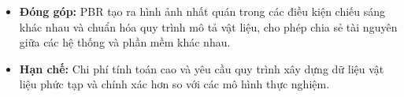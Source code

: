 \begin{enumerate}
\begin{itemize}
\begin{enumerate}
			\item \textit{Bảo toàn năng lượng}\\
			Năng lượng phản xạ ra khỏi bề mặt phải luôn nhỏ hơn hoặc bằng năng lượng ánh sáng chiếu tới.

			\item \textit{Đối ứng Helmholtz}\\
			Việc hoán đổi hướng ánh sáng tới và hướng ánh sáng phản xạ sẽ không làm thay đổi giá trị của BDRF.

			\item \textit{Tính Tuyến tính và Nguyên lý chồng chất}\\
			Tổng độ sáng phản xạ của một bề mặt phải bằng tổng độ phản xạ riêng lẻ từ các thành phần khác nhau.

			\item \textit{Giải Phương trình kết xuất}\\
			Sử dụng các kĩ thuật xấp xỉ được giải nghiệm cho Phương trình kết xuất. 
		\end{enumerate}
		
		\item \textbf{Đóng góp:}
		PBR tạo ra hình ảnh nhất quán trong các điều kiện chiếu sáng khác nhau và chuẩn hóa quy trình mô tả vật liệu, cho phép chia sẻ tài nguyên giữa các hệ thống và phần mềm khác nhau.

		\item \textbf{Hạn chế:}
		Chi phí tính toán cao và yêu cầu quy trình xây dựng dữ liệu vật liệu phức tạp và chính xác hơn so với các mô hình thực nghiệm.
	\end{itemize}
\end{enumerate}